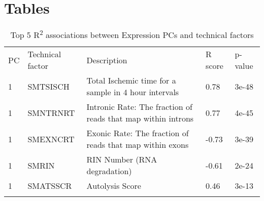 \documentclass[graybox]{svmult}
\begin{document}


\section{Tables}

\begin{table}[H]
\caption{Top 5 R\textsuperscript{2} associations between Expression PCs and technical factors}
\label{tab:expression_pcs_and_tfs}       %
%

\begin{tabular}{p{1cm}p{2.4cm}p{11cm}p{1cm}p{1cm}}
\hline\noalign{\smallskip}
 PC & Technical factor & Description & R score & p-value  \\
\noalign{\smallskip}\svhline\noalign{\smallskip}
1 & SMTSISCH & Total Ischemic time for a sample in 4 hour intervals & 0.78 & 3e-48\\
1 & SMNTRNRT & Intronic Rate: The fraction of reads that map within introns & 0.77 & 4e-45\\
1 & SMEXNCRT & Exonic Rate: The fraction of reads that map within exons & -0.73 & 3e-39 \\
1 & SMRIN & RIN Number (RNA degradation) & -0.61 & 2e-24 \\
1 & SMATSSCR & Autolysis Score & 0.46 & 3e-13 \\
\noalign{\smallskip}\hline\noalign{\smallskip}
\end{tabular}
\end{table}
\end{document}
